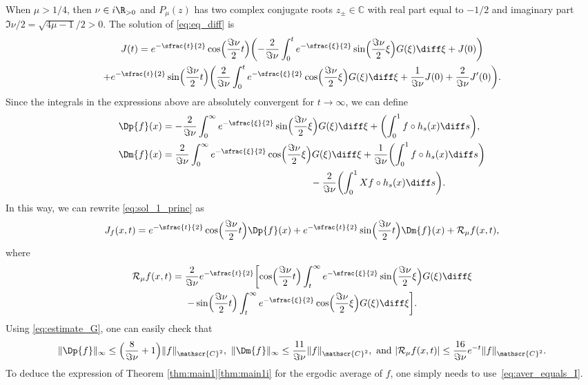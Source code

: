 When $\mu > 1/4$, then $\nu \in i \R_{>0}$ and $P_\mu(z)$ has two complex conjugate roots $z_{\pm} \in \mathbb{C}$ with real part equal to $-1/2$ and imaginary part $\Im \nu / 2 = \sqrt{4 \mu -1} / 2 >0$.
The solution of \eqref{eq:eq_diff} is
\begin{multline}\label{eq:sol_1_princ}
J(t) = e^{-\sfrac{t}{2}} \cos\Bigl(\frac{\Im\nu}{2}t \Bigr) \biggl(- \frac{2}{\Im\nu} \int_0^t e^{-\sfrac{\xi}{2}} \sin\Bigl(\frac{\Im \nu}{2}\xi \Bigr)G(\xi) \diff \xi + J(0) \biggr) \\
+e^{-\sfrac{t}{2}} \sin\Bigl(\frac{\Im\nu}{2}t \Bigr) \biggl(\frac{2}{\Im\nu} \int_0^t e^{-\sfrac{\xi}{2}} \cos\Bigl(\frac{\Im\nu}{2}\xi \Bigr)G(\xi) \diff \xi + \frac{1}{\Im\nu} J(0) + \frac{2}{\Im\nu}J'(0) \biggr).
\end{multline}
Since the integrals in the expressions above are absolutely convergent for $t \to \infty$, we can define
\begin{equation*}
\begin{split}
\Dp{f}(x) &= - \frac{2}{\Im\nu} \int_0^\infty e^{-\sfrac{\xi}{2}} \sin\Bigl(\frac{\Im\nu}{2}\xi \Bigr)G(\xi) \diff \xi + \biggl(\int_0^1 f \circ h_s(x) \diff s \biggr),\\
\Dm{f}(x) &= \frac{2}{\Im\nu} \int_0^\infty e^{-\sfrac{\xi}{2}} \cos\Bigl(\frac{\Im\nu}{2}\xi \Bigr)G(\xi) \diff \xi + \frac{1}{\Im\nu} \biggl(\int_0^1 f \circ h_s(x) \diff s \biggr) \\
& \hspace*{5.4cm}- \frac{2}{\Im\nu}\biggl(\int_0^1 Xf \circ h_s(x) \diff s \biggr).
\end{split}
\end{equation*}
In this way, we can rewrite \eqref{eq:sol_1_princ} as
\begin{equation}\label{eq:I_mu_princ}
J_{f}(x,t) = e^{-\sfrac{t}{2}} \cos\Bigl(\frac{\Im\nu}{2}t \Bigr) \Dp{f}(x) + e^{-\sfrac{t}{2}} \sin\Bigl(\frac{\Im\nu}{2}t \Bigr) \Dm{f}(x) + \mathcal{R}_{\mu}f(x,t),
\end{equation}
where
\begin{multline*}
\mathcal{R}_{\mu}f(x,t) = \frac{2}{\Im\nu} e^{-\sfrac{t}{2}} \biggl[\cos\Bigl(\frac{\Im\nu}{2}t \Bigr) \int_t^\infty e^{-\sfrac{\xi}{2}} \sin\Bigl(\frac{\Im\nu}{2}\xi \Bigr)G(\xi) \diff \xi \\
- \sin\Bigl(\frac{\Im\nu}{2}t \Bigr) \int_t^\infty e^{-\sfrac{\xi}{2}} \cos\Bigl(\frac{\Im\nu}{2}\xi \Bigr)G(\xi) \diff \xi \biggr].
\end{multline*}
Using \eqref{eq:estimate_G}, one can easily check that
\begin{equation*}
\|\Dp{f}\|_{\infty} \leq \Bigl(\frac{8}{\Im\nu} +1 \Bigr) \|f\|_{\mathscr{C}^2}, \ \|\Dm{f}\|_{\infty} \leq \frac{11}{\Im\nu} \|f\|_{\mathscr{C}^2}, \ \text{and}\ |\mathcal{R}_\mu f(x,t) |\leq \frac{16}{\Im\nu} e^{-t}\|f\|_{\mathscr{C}^2}.
\end{equation*}
To deduce the expression of Theorem \ref{thm:main1}\eqref{thm:main1i} for the ergodic average of $f$, one simply needs to use~\eqref{eq:aver_equals_I}.

